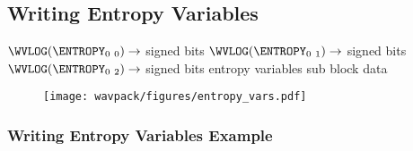 
\subsection{Writing Entropy Variables}
\label{wavpack:write_entropy}
$\WVLOG(\text{\ENTROPY}_{0~0}) \rightarrow$  signed bits\;
$\WVLOG(\text{\ENTROPY}_{0~1}) \rightarrow$  signed bits\;
$\WVLOG(\text{\ENTROPY}_{0~2}) \rightarrow$  signed bits\;
\Return entropy variables sub block data\;
\EALGORITHM

\begin{figure}[h]
  \texttt{[image: wavpack/figures/entropy\_vars.pdf]}
\end{figure}

\clearpage

\subsubsection{Writing Entropy Variables Example}

